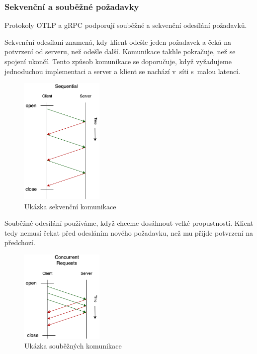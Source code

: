 \subsubsection{Sekvenční a souběžné požadavky}
Protokoly OTLP a gRPC podporují souběžné a sekvenční odesílání požadavků.

Sekvenční odesílaní znamená, kdy klient odešle jeden požadavek a čeká na potvrzení od serveru, než odešle další. Komunikace takhle pokračuje, než se spojení ukončí. Tento způsob komunikace se doporučuje, když vyžadujeme jednoduchou implementaci a server a klient se nachází v~síti s~malou latencí.
\begin{figure}[H]
  \centering
  \includegraphics[width=4cm]{obrazky-figures/otlp-sequential.png}
  \caption{Ukázka sekvenční komunikace\protect\footnotemark}
  \label{fig:oltp-sequence}
\end{figure}

Souběžné odesílání používáme, když chceme dosáhnout velké propustnosti. Klient tedy nemusí čekat před odesláním nového požadavku, než mu přijde potvrzení na předchozí.

\begin{figure}[H]
  \centering
  \includegraphics[width=4cm]{obrazky-figures/otlp-concurrent.png}
  \caption{Ukázka souběžných komunikace\protect\footnotemark}
  \label{fig:oltp-concurrent}
\end{figure}


